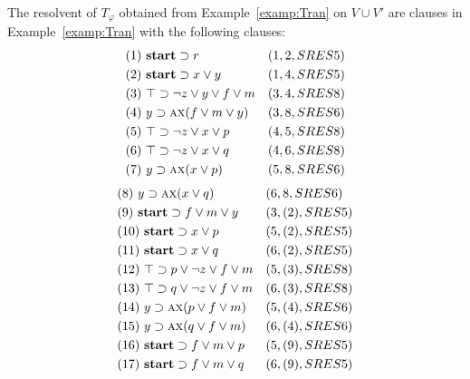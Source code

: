 \documentclass[letterpaper]{article} %
\begin{document}
\begin{example}\label{examp:Res}
The resolvent of $T_{\varphi}$ obtained from Example~\ref{examp:Tran} on $V\cup V'$ are clauses in Example~\ref{examp:Tran} with the following clauses:
\begin{align*}
&(1)\ \textbf{start} \supset r && (1,2,SRES 5)\\
&(2)\ \textbf{start} \supset x \vee y && (1,4,SRES 5)\\
&(3)\ \top \supset \neg z \vee y \vee f \vee m && (3, 4, SRES 8)\\
&(4)\ y \supset \textsc{a}\textsc{x}(f\vee m\vee y) && (3,8, SRES 6)\\
&(5)\ \top \supset \neg z \vee x \vee p && (4,5, SRES 8)\\
&(6)\ \top \supset \neg z \vee x \vee q && (4,6, SRES 8)\\
&(7)\ y \supset \textsc{a}\textsc{x}(x\vee p) && (5, 8, SRES 6)\\
\end{align*}
\begin{align*}
&(8)\ y \supset \textsc{a}\textsc{x}(x\vee q) && (6, 8, SRES 6)\\
&(9)\ \textbf{start} \supset f\vee m \vee y && (3,(2), SRES 5) \\
&(10)\ \textbf{start} \supset x \vee p && (5,(2),SRES 5) \\
&(11)\ \textbf{start} \supset x \vee q && (6,(2), SRES 5)\\
& (12)\ \top \supset p \vee \neg z \vee f \vee m && (5,(3), SRES 8)\\
& (13)\ \top \supset q \vee \neg z \vee f \vee m && (6,(3), SRES 8)\\
&(14)\ y \supset \textsc{a}\textsc{x}(p \vee f\vee m) && (5, (4), SRES 6) \\
&(15)\ y \supset \textsc{a}\textsc{x}(q \vee f\vee m) && (6, (4), SRES 6) \\
&(16)\ \textbf{start} \supset f\vee m \vee p && (5, (9), SRES 5) \\
&(17)\ \textbf{start} \supset f\vee m \vee q && (6, (9), SRES 5)
\end{align*}
\end{example}
\end{document}
